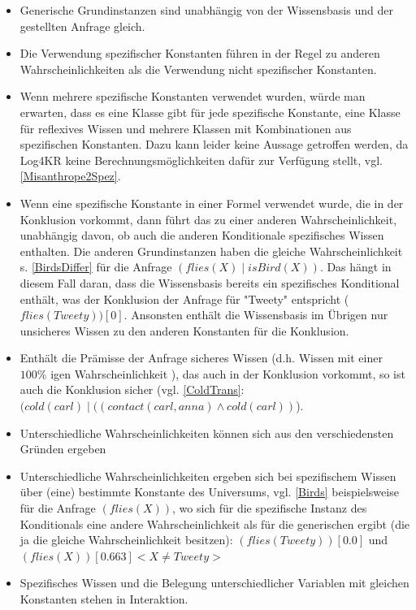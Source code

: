 \documentclass[a4paper, 11pt]{book}
\begin{document}
\begin{itemize}
	\item 	Generische Grundinstanzen  sind unabhängig von der Wissensbasis und der gestellten Anfrage gleich.
	\item Die Verwendung spezifischer Konstanten   führen in der Regel zu anderen Wahrscheinlichkeiten als die Verwendung nicht spezifischer Konstanten.
	\item Wenn mehrere spezifische Konstanten verwendet wurden, würde man erwarten, dass es eine Klasse gibt für jede spezifische Konstante, eine Klasse für reflexives Wissen und mehrere Klassen mit Kombinationen aus spezifischen Konstanten. Dazu kann leider keine Aussage getroffen werden, da Log4KR keine Berechnungsmöglichkeiten dafür zur Verfügung stellt, vgl.  \ref{Misanthrope2Spez}.
	\item Wenn eine spezifische Konstante in einer Formel verwendet wurde, die in der Konklusion vorkommt, dann führt das zu einer anderen Wahrscheinlichkeit, unabhängig davon, ob auch die anderen Konditionale spezifisches Wissen enthalten. Die anderen Grundinstanzen haben die gleiche Wahrscheinlichkeit s. \ref{BirdsDiffer} für die Anfrage $ (flies(X) \mid isBird(X))$. Das hängt in diesem Fall daran, dass die Wissensbasis bereits ein spezifisches Konditional enthält, was der Konklusion der Anfrage für "{}Tweety"{} entspricht ($ flies(Tweety))[0] $. Ansonsten enthält die Wissensbasis im Übrigen nur unsicheres Wissen zu den anderen Konstanten für die Konklusion.
	\item Enthält die Prämisse der Anfrage sicheres Wissen (d.h. Wissen mit einer $ 100 \%  $ igen Wahrscheinlichkeit ), das auch in der Konklusion vorkommt, so ist auch die Konklusion sicher (vgl. \ref{ColdTrans}:$(cold(carl) \mid ((contact(carl,anna)  \land cold(carl)) $). 
	\item Unterschiedliche Wahrscheinlichkeiten können sich aus den verschiedensten Gründen ergeben
	\item Unterschiedliche Wahrscheinlichkeiten ergeben sich bei spezifischem Wissen über (eine) bestimmte Konstante des Universums, vgl. \ref{Birds} beispielsweise für die Anfrage $ (flies(X)) $, wo sich für die spezifische Instanz des Konditionals eine andere Wahrscheinlichkeit als für die generischen ergibt (die ja die gleiche Wahrscheinlichkeit besitzen): $ (flies(Tweety))[0.0] $ und $ (flies(X))[0.663]<X \neq Tweety> $
	\item Spezifisches Wissen und die Belegung unterschiedlicher Variablen mit gleichen Konstanten stehen in Interaktion.

\end{itemize}
\end{document}
